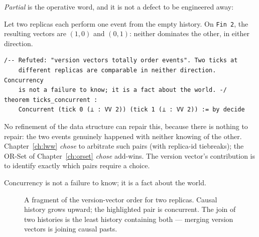 \documentclass[12pt, a4paper, openright]{book}
\theoremstyle{thmstyle}
\theoremstyle{defstyle}
\newcommand{\lc}[1]{\texttt{#1}}
\newcounter{refutation}[chapter]
\renewcommand{\therefutation}{\thechapter.\arabic{refutation}}
\newenvironment{refutedbox}[1]{%
  \refstepcounter{refutation}%
  \begin{tcolorbox}[refutedbox,
    title={Refuted \therefutation\ --- #1}]%
}{\end{tcolorbox}}
\begin{document}
\emph{Partial} is the operative word, and it is not a defect to be
engineered away:

\begin{refutedbox}{Version vectors totally order events}
  \label{ref:vv-total}
  Let two replicas each perform one event from the empty history. On
  \lc{Fin 2}, the resulting vectors are $(1,0)$ and $(0,1)$: neither
  dominates the other, in either direction.
\begin{verbatim}
/-- Refuted: "version vectors totally order events". Two ticks at
    different replicas are comparable in neither direction. Concurrency
    is not a failure to know; it is a fact about the world. -/
theorem ticks_concurrent :
    Concurrent (tick 0 (⊥ : VV 2)) (tick 1 (⊥ : VV 2)) := by decide
\end{verbatim}
  No refinement of the data structure can repair this, because there is
  nothing to repair: the two events genuinely happened with neither
  knowing of the other. Chapter~\ref{ch:lww} \emph{chose} to arbitrate
  such pairs (with replica-id tiebreaks); the OR-Set of
  Chapter~\ref{ch:orset} \emph{chose} add-wins. The version vector's
  contribution is to identify exactly which pairs require a choice.
\end{refutedbox}

Concurrency is not a failure to know; it is a fact about the world.

\begin{figure}[h]
  \centering
  \caption{A fragment of the version-vector order for two replicas.
    Causal history grows upward; the highlighted pair is concurrent.
    The join of two histories is the least history containing both ---
    merging version vectors is joining causal pasts.}
\end{figure}
\end{document}
